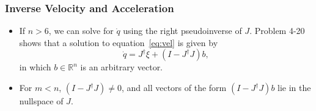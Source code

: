 \begin{frame}
    \frametitle{Inverse Velocity and Acceleration}

    \begin{itemize}
        \item If $n > 6$, we can solve for $\dot{q}$ using the right
        pseudoinverse of $J$. Problem 4-20 shows that a solution to
        equation~\eqref{eq:vel} is given by 
        \[ \dot{q} = J^\dagger \xi + (I - J^\dagger J)b, \] in which $b \in
        \mathbb{R}^n$ is an arbitrary vector.
        \item For $m < n$, $(I - J^\dagger J) \neq 0$, and all vectors of the
        form $(I - J^\dagger J)b$ lie in the nullspace of $J$.
    \end{itemize}
\end{frame}


\endgroup